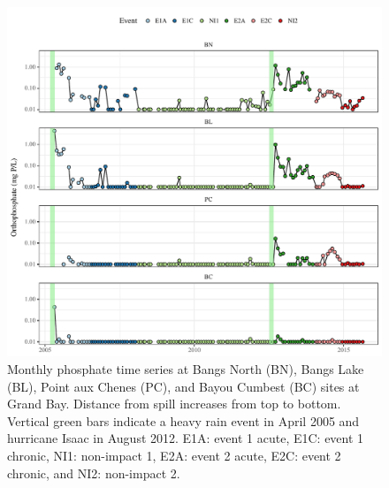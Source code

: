 \documentclass[letterpaper,12pt]{article}\usepackage[]{graphicx}\usepackage[]{color}
\makeatletter
\def\maxwidth{ %
  \ifdim\Gin@nat@width>\linewidth
    \linewidth
  \else
    \Gin@nat@width
  \fi
}
\makeatother
\begin{document}
\begin{figure}[!ht]

{\centering \includegraphics[width=\maxwidth]{figs/Fig4} 

}

\caption[Monthly phosphate time series at Bangs North (BN), Bangs Lake (BL), Point aux Chenes (PC), and Bayou Cumbest (BC) sites at Grand Bay]{Monthly phosphate time series at Bangs North (BN), Bangs Lake (BL), Point aux Chenes (PC), and Bayou Cumbest (BC) sites at Grand Bay. Distance from spill increases from top to bottom. Vertical green bars indicate a heavy rain event in April 2005 and hurricane Isaac in August 2012. E1A: event 1 acute, E1C: event 1 chronic, NI1: non-impact 1, E2A: event 2 acute, E2C: event 2 chronic, and NI2: non-impact 2.}\label{fig:Fig4}
\end{figure}


\clearpage
\end{document}
